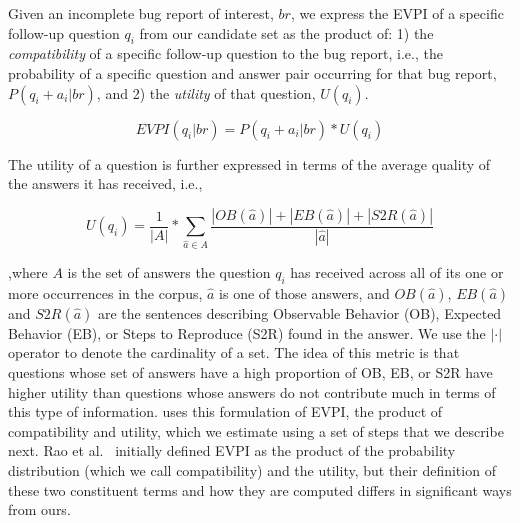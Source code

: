 Given an incomplete bug report of interest, $br$, we express the EVPI of a specific follow-up question $q_{i}$ from our candidate set
as the product of: 1) the {\em compatibility} of a specific follow-up question to the bug report, i.e.,
the probability of a specific question and answer pair occurring for that bug report, $P(q_{i}+a_{i}|br)$, and 2) the {\em utility} of that question, $U(q_{i})$.

$$EVPI(q_{i}|br) = P(q_{i}+a_{i}|br) * U(q_{i})$$

The utility of a question is further expressed in terms of the average quality of the answers it has received, i.e.,

$$U(q_{i}) = \frac{1}{|A|} * \sum_{\hat a \in A}^{} \frac{|OB(\hat a)|+|EB(\hat a)|+|S2R(\hat a)|}{|\hat a|}$$

\noindent
,where $A$ is the set of answers the question $q_{i}$ has received across all of its one or more occurrences in the
corpus, $\hat a$ is one of those answers, and $OB(\hat a)$, $EB(\hat a)$ and $S2R(\hat a)$ are the sentences describing Observable Behavior (OB), Expected Behavior (EB), or
Steps to Reproduce (S2R) found in the answer. We use the $|\cdot|$ operator to denote the cardinality of a set.
The idea of this metric is that questions whose set of answers have a high proportion
of OB, EB, or S2R have higher utility than questions whose answers do not contribute much in
terms of this type of information. \evpi uses this formulation of EVPI, the product of compatibility and utility, which we
estimate using a set of steps that we describe next. Rao et al.~\cite{rao-daume-iii-2018-learning} initially defined EVPI as the product of the probability distribution (which we call compatibility) and the utility, but their definition of these two constituent terms and how they are computed differs in significant ways from ours. 


